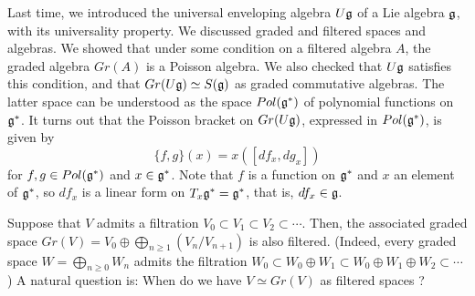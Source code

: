  \setcounter{lecture}{8}

 Last time, we introduced the universal enveloping algebra $U\mathfrak{g}$ of a Lie algebra
 $\mathfrak{g}$, with its universality property. We discussed graded and filtered spaces and
 algebras. We showed that under some condition on a filtered algebra $A$, the graded
 algebra $Gr(A)$ is a Poisson algebra. We also checked that $U\mathfrak{g}$ satisfies this
 condition, and that $Gr(U\mathfrak{g})\simeq S(\mathfrak{g})$ as graded commutative algebras. The latter
 space can be understood as the space $Pol(\mathfrak{g}^*)$ of polynomial functions on $\mathfrak{g}^*$.
 It turns out that the Poisson bracket on $Gr(U\mathfrak{g})$, expressed in $Pol(\mathfrak{g}^*)$, is
 given by
 \[
    \{f,g\}(x) = x([df_x,dg_x])
 \]
 for $f,g\in Pol(\mathfrak{g}^*)$ and $x\in \mathfrak{g}^*$. Note that $f$ is a function on $\mathfrak{g}^*$ and $x$
 an element of $\mathfrak{g}^*$, so $df_x$ is a linear form on $T_x\mathfrak{g}^*=\mathfrak{g}^*$, that is,
 $df_x\in\mathfrak{g}$.

 Suppose that $V$ admits a filtration $V_0\subset V_1\subset V_2\subset\cdots $. Then,
 the associated graded space $Gr(V)=V_0\oplus \bigoplus_{n\ge 1} (V_n/V_{n+1})$ is also
 filtered. (Indeed, every graded space $W=\bigoplus_{n\ge 0}W_n$ admits the filtration
 $W_0\subset W_0\oplus W_1\subset W_0\oplus W_1\oplus W_2\subset\cdots$) A natural
 question is:
 When do we have $V\simeq Gr(V)$ as filtered spaces ?

